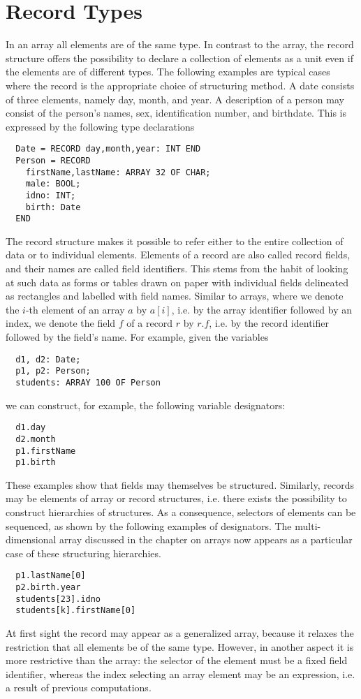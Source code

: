 \chapter{Record Types}
In an array all elements are of the same type. In contrast to the array, the record structure offers the
possibility to declare a collection of elements as a unit even if the elements are of different types.
The following examples are typical cases where the record is the appropriate choice of structuring
method. A date consists of three elements, namely day, month, and year. A description of a person
may consist of the person's names, sex, identification number, and birthdate. This is expressed by
the following type declarations
\begin{verbatim}
  Date = RECORD day,month,year: INT END
  Person = RECORD
    firstName,lastName: ARRAY 32 OF CHAR;
    male: BOOL;
    idno: INT;
    birth: Date
  END
\end{verbatim}
The record structure makes it possible to refer either to the entire collection of data or to individual
elements. Elements of a record are also called record fields, and their names are called field
identifiers. This stems from the habit of looking at such data as forms or tables drawn on paper with
individual fields delineated as rectangles and labelled with field names. Similar to arrays, where we
denote the $i$-th element of an array $a$ by $a[i]$, i.e. by the array identifier followed by an index,
we denote the field $f$ of a record $r$ by $r.f$, i.e. by the record identifier followed by the field's
name. For example, given the variables
\begin{verbatim}
  d1, d2: Date;
  p1, p2: Person;
  students: ARRAY 100 OF Person
\end{verbatim}
we can construct, for example, the following variable designators:
\begin{verbatim}
  d1.day
  d2.month
  p1.firstName
  p1.birth
\end{verbatim}
These examples show that fields may themselves be structured. Similarly, records may be
elements of array or record structures, i.e. there exists the possibility to construct hierarchies of
structures. As a consequence, selectors of elements can be sequenced, as shown by the following
examples of designators. The multi-dimensional array discussed in the chapter on arrays now
appears as a particular case of these structuring hierarchies.
\begin{verbatim}
  p1.lastName[0]
  p2.birth.year
  students[23].idno
  students[k].firstName[0]
\end{verbatim}
At first sight the record may appear as a generalized array, because it relaxes the restriction that all
elements be of the same type. However, in another aspect it is more restrictive than the array: the
selector of the element must be a fixed field identifier, whereas the index selecting an array element
may be an expression, i.e. a result of previous computations.


